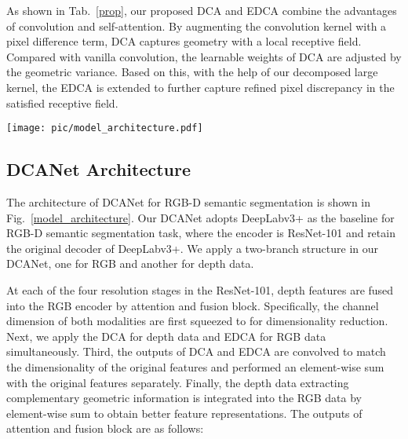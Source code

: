 \documentclass[10pt,twocolumn,letterpaper]{article}
\begin{document}
As shown in Tab.~\ref{prop}, our proposed DCA and EDCA combine the advantages of convolution and self-attention. By augmenting the convolution kernel with a pixel difference
term, DCA captures geometry with a local receptive field. Compared with vanilla convolution, the learnable weights of DCA are adjusted
by the geometric variance.
Based on this, with the help of our decomposed large kernel, the EDCA is extended to further capture refined pixel discrepancy in the satisfied receptive field.


\begin{figure*}
   \centering
\centering
   \centerline{
      \texttt{[image: pic/model\_architecture.pdf]}
   }
   \caption{The overview of our network. The network consists of two ResNet-101 encoders, where DCA and EDCA are plugged
      into CNNs as an attention module for each block of each ResNet-101 encoder in RGB and Depth branches, respectively. We employ the
      original decoder DeepLabv3+. During training, each pair of feature maps are fused by the attention and fusion block and propagated to the next stage of the
      encoder for further feature transformation.}
   \label{model_architecture}
\end{figure*}

\subsection{DCANet Architecture}
The architecture of DCANet for RGB-D semantic segmentation is shown in Fig.~\ref{model_architecture}. Our DCANet adopts
DeepLabv3+ \cite{chen2018encoder} as the baseline for RGB-D semantic segmentation task, where the encoder is
ResNet-101 \cite{he2016deep} and retain the original decoder of DeepLabv3+. We apply a two-branch structure in our DCANet,
one for RGB and another for depth data.



At each of the four resolution stages in the ResNet-101, depth features are fused into the RGB encoder by attention and fusion block. Specifically, the channel
dimension of both modalities are first squeezed to  for dimensionality reduction. Next, we apply the DCA for depth data and EDCA for
RGB data simultaneously. Third, the outputs of DCA and EDCA are convolved to match the dimensionality of the original features
and performed an element-wise sum with the original features separately. Finally, the depth data extracting complementary geometric
information is integrated into the RGB data by element-wise sum to obtain better feature representations. The outputs of attention and
fusion block are as follows:
\end{document}
